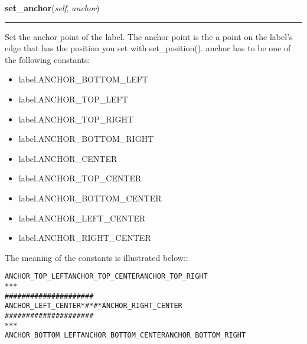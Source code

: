 \hspace{.8\funcindent}\begin{boxedminipage}{\funcwidth}

    \raggedright \textbf{set\_anchor}(\textit{self}, \textit{anchor})

    \vspace{-1.5ex}

    \rule{\textwidth}{0.5\fboxrule}
\setlength{\parskip}{2ex}
    Set the anchor point of the label. The anchor point is the a point on 
    the label's edge that has the position you set with set\_position(). 
    anchor has to be one of the following constants:

    \begin{itemize}
    \setlength{\parskip}{0.6ex}
      \item label.ANCHOR\_BOTTOM\_LEFT

      \item label.ANCHOR\_TOP\_LEFT

      \item label.ANCHOR\_TOP\_RIGHT

      \item label.ANCHOR\_BOTTOM\_RIGHT

      \item label.ANCHOR\_CENTER

      \item label.ANCHOR\_TOP\_CENTER

      \item label.ANCHOR\_BOTTOM\_CENTER

      \item label.ANCHOR\_LEFT\_CENTER

      \item label.ANCHOR\_RIGHT\_CENTER

    \end{itemize}

    The meaning of the constants is illustrated below::

\begin{alltt}
    ANCHOR\_TOP\_LEFT     ANCHOR\_TOP\_CENTER   ANCHOR\_TOP\_RIGHT
                   *           *           *
                     \#\#\#\#\#\#\#\#\#\#\#\#\#\#\#\#\#\#\#\#\#
ANCHOR\_LEFT\_CENTER * \#         *         \# * ANCHOR\_RIGHT\_CENTER
                     \#\#\#\#\#\#\#\#\#\#\#\#\#\#\#\#\#\#\#\#\#
                   *           *           *
 ANCHOR\_BOTTOM\_LEFT   ANCHOR\_BOTTOM\_CENTER  ANCHOR\_BOTTOM\_RIGHT\end{alltt}


\end{boxedminipage}
